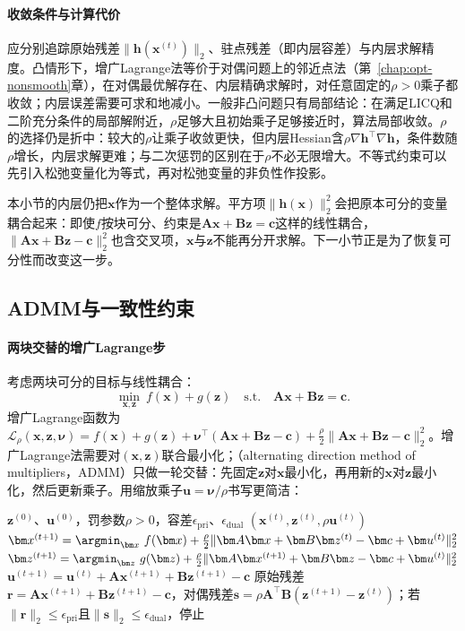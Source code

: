 \paragraph{收敛条件与计算代价}
应分别追踪原始残差$\lVert\bm h(\bm x^{(t)})\rVert_2$、驻点残差（即内层容差）与内层求解精度。凸情形下，增广Lagrange法等价于对偶问题上的邻近点法（第~\ref{chap:opt-nonsmooth}章），在对偶最优解存在、内层精确求解时，对任意固定的$\rho>0$乘子都收敛；内层误差需要可求和地减小。一般非凸问题只有局部结论：在满足LICQ和二阶充分条件的局部解附近，$\rho$足够大且初始乘子足够接近时，算法局部收敛。$\rho$的选择仍是折中：较大的$\rho$让乘子收敛更快，但内层Hessian含$\rho\nabla\bm h^\top\nabla\bm h$，条件数随$\rho$增长，内层求解更难；与二次惩罚的区别在于$\rho$不必无限增大。不等式约束可以先引入松弛变量化为等式，再对松弛变量的非负性作投影。

本小节的内层仍把$\bm x$作为一个整体求解。平方项$\lVert\bm h(\bm x)\rVert_2^2$会把原本可分的变量耦合起来：即使$f$按块可分、约束是$\bm A\bm x+\bm B\bm z=\bm c$这样的线性耦合，$\lVert\bm A\bm x+\bm B\bm z-\bm c\rVert_2^2$也含交叉项，$\bm x$与$\bm z$不能再分开求解。下一小节正是为了恢复可分性而改变这一步。

\subsection{ADMM与一致性约束}
\label{sec:opt-con-admm}

\paragraph{两块交替的增广Lagrange步}
考虑两块可分的目标与线性耦合：
\[
  \min_{\bm x,\bm z}\ f(\bm x)+g(\bm z)\quad\text{s.t.}\quad\bm A\bm x+\bm B\bm z=\bm c.
\]
增广Lagrange函数为$\mathcal L_\rho(\bm x,\bm z,\bm\nu)=f(\bm x)+g(\bm z)+\bm\nu^\top(\bm A\bm x+\bm B\bm z-\bm c)+\frac\rho2\lVert\bm A\bm x+\bm B\bm z-\bm c\rVert_2^2$。增广Lagrange法需要对$(\bm x,\bm z)$联合最小化；（alternating direction method of multipliers，ADMM）只做一轮交替：先固定$\bm z$对$\bm x$最小化，再用新的$\bm x$对$\bm z$最小化，然后更新乘子。用缩放乘子$\bm u=\bm\nu/\rho$书写更简洁：

\begin{algorithm}
\label{alg:opt-con-admm}
\begin{algorithmic}[1]
\Require $\bm z^{(0)}$、$\bm u^{(0)}$，罚参数$\rho>0$，容差$\epsilon_{\mathrm{pri}}$、$\epsilon_{\mathrm{dual}}$
\Ensure $(\bm x^{(t)},\bm z^{(t)},\rho\bm u^{(t)})$
  \State $\bm x^{(t+1)}=\argmin_{\bm x}\ f(\bm x)+\frac\rho2\lVert\bm A\bm x+\bm B\bm z^{(t)}-\bm c+\bm u^{(t)}\rVert_2^2$
  \State $\bm z^{(t+1)}=\argmin_{\bm z}\ g(\bm z)+\frac\rho2\lVert\bm A\bm x^{(t+1)}+\bm B\bm z-\bm c+\bm u^{(t)}\rVert_2^2$
  \State $\bm u^{(t+1)}=\bm u^{(t)}+\bm A\bm x^{(t+1)}+\bm B\bm z^{(t+1)}-\bm c$
  \State 原始残差$\bm r=\bm A\bm x^{(t+1)}+\bm B\bm z^{(t+1)}-\bm c$，对偶残差$\bm s=\rho\bm A^\top\bm B(\bm z^{(t+1)}-\bm z^{(t)})$；若$\lVert\bm r\rVert_2\leq\epsilon_{\mathrm{pri}}$且$\lVert\bm s\rVert_2\leq\epsilon_{\mathrm{dual}}$，停止
\EndFor
\end{algorithmic}
\end{algorithm}

